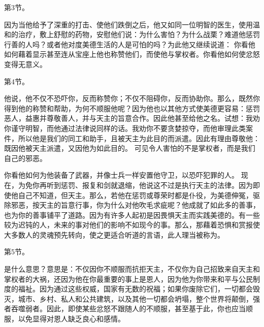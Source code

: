 第3节。 \par

因为当他给予了深重的打击、使他们跌倒之后，他又如同一位明智的医生，使用温和的治疗，敷上舒慰的药物，安慰他们说：为什么害怕？为什么战栗？难道他惩罚行善的人吗？或者他对度美德生活的人是可怕的吗？为此他又继续说道： 你看他如何藉着显示甚至连从宝座上他也称赞他们，而使他与掌权者。你看他如何使忿怒变得无意义。\par

第4节。 \par

他说，他不仅不恐吓你，反而称赞你；不仅不阻碍你，反而协助你。那么，既然你得到他的称赞和帮助，为何不顺服他呢？因为他也以其他方式使美德更容易：惩罚恶人，益惠并尊敬善人，并与天主的旨意合作。因此他甚至给他之名。试想：我劝你谨守明智，而他通过法律说同样的话。我劝你不要贪婪掠夺，而他审理此类案件，所以他是我们的同工和助手，且被天主为此目的而派遣。因此有理由尊敬他：既因他被天主派遣，又因他为如此目的。 可见令人害怕的不是掌权者，而是我们自己的邪恶。\par

 你看他如何为他装备了武器，并像士兵一样安置他守卫，以恐吓犯罪的人。 现在，为免你再听到惩罚、报复和剑就退缩，他说这不过是执行天主的法律。因为即使他自己不知道，但天主。那么，若他在惩罚或尊荣时都是仆役，为美德伸冤，驱除邪恶，按天主的旨意行事，你为什么对他吹毛求疵呢？他成就了如此多的善事，也为你的善事铺平了道路。因为有许多人起初是因畏惧天主而实践美德的。有一些较为迟钝的人，未来的事对他们的影响不如现今的事。那么，那藉着恐惧和赏报使大多数人的灵魂预先转向，使之更适合听道的言语，此人理当被称为。\par

第5节。 \par

是什么意思？意思是：不仅因你不顺服而抗拒天主，不仅你为自己招致来自天主和掌权者的大祸，还因为他在你最重要的事上是恩人，因为他为你带来和平与公民制度的福祉。因为通过这些权威，国家有无数的祝福；如果你废除它们，一切都会毁灭，城市、乡村、私人和公共建筑，以及其他一切都会坍塌，整个世界将颠倒，强者吞噬弱者。因此，即使某些忿怒不跟随人的不顺服，甚至基于此，你也应当顺服，以免显得对恩人缺乏良心和感情。\par

